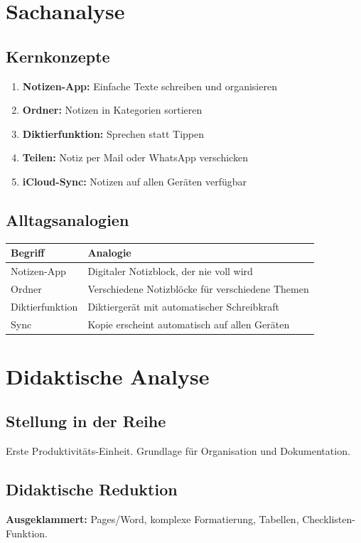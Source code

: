 \documentclass[11pt,a4paper]{article}
\begin{document}
\section{Sachanalyse}

\subsection{Kernkonzepte}
\begin{enumerate}
    \item \textbf{Notizen-App:} Einfache Texte schreiben und organisieren
    \item \textbf{Ordner:} Notizen in Kategorien sortieren
    \item \textbf{Diktierfunktion:} Sprechen statt Tippen
    \item \textbf{Teilen:} Notiz per Mail oder WhatsApp verschicken
    \item \textbf{iCloud-Sync:} Notizen auf allen Geräten verfügbar
\end{enumerate}

\subsection{Alltagsanalogien}
\begin{tabular}{|l|p{8cm}|}
\hline
\textbf{Begriff} & \textbf{Analogie} \\
\hline
Notizen-App & Digitaler Notizblock, der nie voll wird \\
Ordner & Verschiedene Notizblöcke für verschiedene Themen \\
Diktierfunktion & Diktiergerät mit automatischer Schreibkraft \\
Sync & Kopie erscheint automatisch auf allen Geräten \\
\hline
\end{tabular}

\section{Didaktische Analyse}

\subsection{Stellung in der Reihe}
Erste Produktivitäts-Einheit. Grundlage für Organisation und Dokumentation.

\subsection{Didaktische Reduktion}
\textbf{Ausgeklammert:} Pages/Word, komplexe Formatierung, Tabellen, Checklisten-Funktion.
\end{document}
